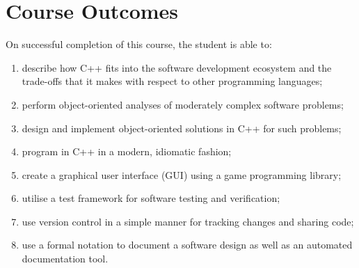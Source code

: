 \documentclass[11pt]{eie-cbo}
\begin{document}
\section{Course Outcomes}\label{sec:outcomes}
On successful completion of this course, the student is able to:
\begin{enumerate}
	\item describe how C++ fits into the software development ecosystem and the trade-offs that it makes with respect to other programming languages;
	\item perform object-oriented analyses of moderately complex software problems;
	\item design and implement object-oriented solutions in C++ for such problems;
	\item program in C++ in a modern, idiomatic fashion;
	\item create a graphical user interface (GUI) using a game programming library;
	\item utilise a test framework for software testing and verification;
	\item use version control in a simple manner for tracking changes and sharing code;
	\item use a formal notation to document a software design as well as an automated documentation tool.
\end{enumerate}

\end{document}
